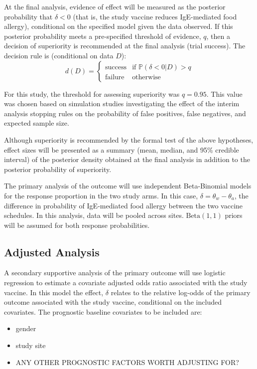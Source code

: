 \documentclass{bmcart}
\begin{document}
At the final analysis, evidence of effect will be measured as the posterior probability that $\delta < 0$ (that is, the study vaccine reduces IgE-mediated food allergy), conditional on the specified model given the data observed.
If this posterior probability meets a pre-specified threshold of evidence, \(q\), then a decision of superiority is recommended at the final analysis (trial success).
The decision rule is (conditional on data $D$):
$$
d(D) = \begin{cases}
\text{success} & \text{if } \mathbb{P}(\delta<0|D)>q \\
\text{failure}\ & \text{otherwise}
\end{cases}
$$

For this study, the threshold for assessing superiority was $q=0.95$.
This value was chosen based on simulation studies investigating the effect of the interim analysis stopping rules on the probability of false positives, false negatives, and expected sample size.

Although superiority is recommended by the formal test of the above hypotheses, effect sizes will be presented as a summary (mean, median, and 95\% credible interval) of the posterior density obtained at the final analysis in addition to the posterior probability of superiority.

The primary analysis of the outcome will use independent Beta-Binomial models for the response proportion in the two study arms.
In this case, $\delta=\theta_w-\theta_a$, the difference in probability of IgE-mediated food allergy between the two vaccine schedules.
In this analysis, data will be pooled across sites.
$\text{Beta}(1,1)$ priors will be assumed for both response probabilities.

\subsection*{Adjusted Analysis}

A secondary supportive analysis of the primary outcome will use logistic regression to estimate a covariate adjusted odds ratio associated with the study vaccine.
In this model the effect, $\delta$ relates to the relative log-odds of the primary outcome associated with the study vaccine, conditional on the included covariates.
The prognostic baseline covariates to be included are:
\begin{itemize}
	\item gender
	\item study site
	\item ANY OTHER PROGNOSTIC FACTORS WORTH ADJUSTING FOR?
\end{itemize}
\end{document}

